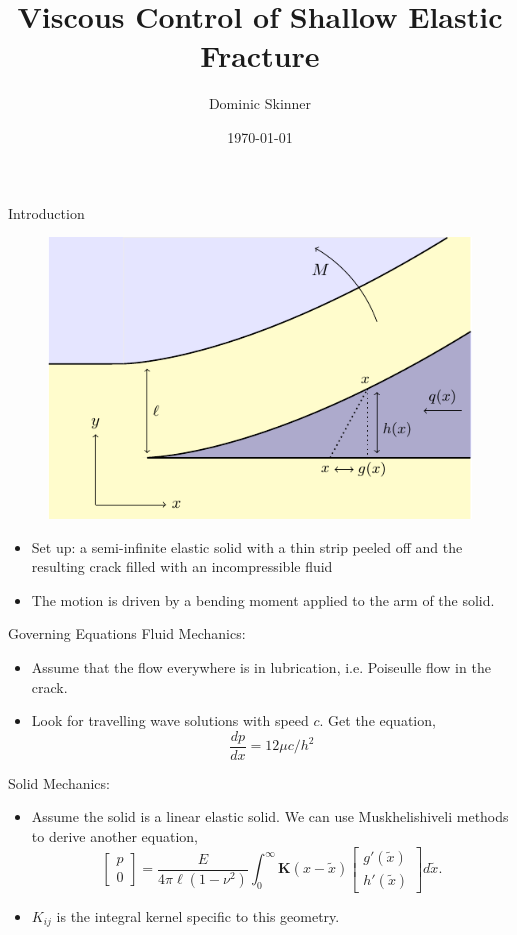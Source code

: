 \documentclass{beamer}
\title{Viscous Control of Shallow Elastic Fracture}
\author{Dominic Skinner}
\date{\today}
\begin{document}
\begin{frame}
\titlepage
\end{frame}

\begin{frame}{Introduction}
\begin{figure}
  \centerline{\includegraphics[scale=0.7]{./../Fig1.pdf}}
\end{figure}
\begin{itemize}
\item Set up: a semi-infinite elastic solid with a thin strip peeled off and 
      the resulting crack filled with an incompressible fluid
\item The motion is driven by a bending moment applied to the arm of the solid.
\end{itemize}
\end{frame}

\begin{frame}{Governing Equations}
Fluid Mechanics:
\begin{itemize}
\item Assume that the flow everywhere is in lubrication, i.e. Poiseulle
      flow in the crack. 
\item Look for travelling wave solutions with speed $c$. 
      Get the equation,
      $$ \frac{dp}{dx} = 12 \mu c /h^2 $$
\end{itemize}
Solid Mechanics:
\begin{itemize}
\item Assume the solid is a linear elastic solid. We can use Muskhelishiveli 
      methods to derive another equation,
      $$ \left[ \begin{array}{c} p \\ 0 \end{array} \right] 
      = \frac{E}{ 4\pi \ell (1-\nu^2) } \int_0^{\infty} \boldsymbol{K}
      (x - \tilde{x}) \left[ \begin{array}{c} g'(\tilde{x}) \\  h'(\tilde{x})
      \end{array} \right] d \tilde{x} . $$
\item $K_{ij}$ is the integral kernel specific to this geometry.
\end{itemize}
\end{frame}
\end{document}
